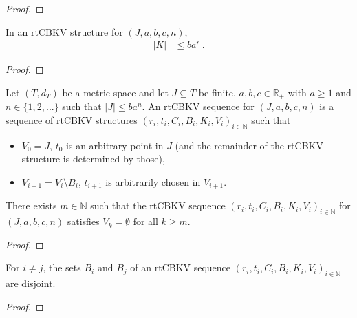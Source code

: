 \begin{proof}

\end{proof}


\begin{lemma}\label{lem:card_K_le}
In an rtCBKV structure for $(J, a, b, c, n)$,
\begin{align*}
  \vert K \vert
  &\le b a^r
  \: .
\end{align*}
\end{lemma}

\begin{proof}

\end{proof}


\begin{definition}\label{def:rtCBKVSequence}
Let $(T,d_T)$ be a metric space and let $J \subseteq T$ be finite, $a,b,c \in \mathbb R_+$ with $a \ge 1$ and $n \in \{1, 2, ...\}$ such that $|J| \le b a^n$.
An rtCBKV sequence for $(J, a, b, c, n)$ is a sequence of rtCBKV structures $(r_i, t_i, C_i, B_i, K_i, V_i)_{i \in \mathbb{N}}$ such that
\begin{itemize}
  \item $V_0 = J$, $t_0$ is an arbitrary point in $J$ (and the remainder of the rtCBKV structure is determined by those),
  \item $V_{i+1} = V_i \setminus B_i$, $t_{i+1}$ is arbitrarily chosen in $V_{i+1}$.
\end{itemize}
\end{definition}


\begin{lemma}\label{lem:rtCBKVSequence_eq_zero}
There exists $m \in \mathbb{N}$ such that the rtCBKV sequence $(r_i, t_i, C_i, B_i, K_i, V_i)_{i \in \mathbb{N}}$ for $(J, a, b, c, n)$ satisfies $V_k = \emptyset$ for all $k \ge m$.
\end{lemma}

\begin{proof}

\end{proof}


\begin{lemma}\label{lem:rtCBKVSequence_disjoint_B}
For $i \ne j$, the sets $B_i$ and $B_j$ of an rtCBKV sequence $(r_i, t_i, C_i, B_i, K_i, V_i)_{i \in \mathbb{N}}$ are disjoint.
\end{lemma}

\begin{proof}

\end{proof}


